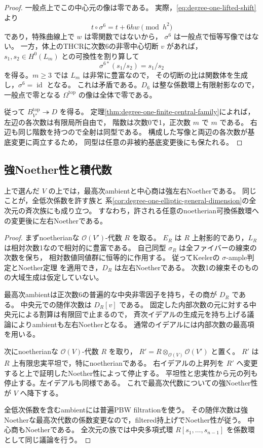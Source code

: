 \begin{proof}
一般点上でこの中心元の像は零である。
実際，\eqref{eq:degree-one-lifted-shift}より
\[
 t\circ\sigma^6=t+6hw\pmod {h^2}
\]
であり，特殊曲線上で $w$ は零関数ではないから，
$\sigma^6$ は一般点で恒等写像ではない。
一方，体上のTHCRに次数6の非零中心切断 $v$ があれば，
$s_1,s_2\in H^0(L_m)$ との可換性を割り算して
\[
 \sigma^{6*}(s_1/s_2)=s_1/s_2
\]
を得る。$m\ge3$ では $L_m$ は非常に豊富なので，
その切断の比は関数体を生成し，$\sigma^6=\operatorname{id}$ となる。
これは矛盾である。$D_6$ は整な係数環上有限射影なので，
一般点で零となる $\Omega^{\mathrm{top}}$ の像は全体で零である。

従って $B^{\mathrm{top}}_{V'}\twoheadrightarrow D$ を得る。
定理\ref{thm:degree-one-finite-central-family}によれば，左辺の各次数は有限局所自由で，
階数は次数0で1，正次数 $m$ で $m$ である。
右辺も同じ階数を持つので全射は同型である。
構成した写像と両辺の各次数が基底変更に両立するため，
同型は任意の非被約基底変更後にも保たれる。
\end{proof}

\subsection{強Noether性と積代数}

\begin{corollary}\label{cor:degree-one-strong-noetherian}
上で選んだ $V$ の上では，最高次ambientと中心商は強左右Noetherである。
同じことが，全低次係数を許す族と
系\ref{cor:degree-one-elliptic-general-dimension}の全次元の斉次族にも成り立つ。
すなわち，許される任意のnoetherian可換係数環への変更後に左右Noetherである。
\end{corollary}
\begin{proof}
まずnoetherianな $\mathcal O(V')$-代数 $R$ を取る。
$E_R$ は $R$ 上射影的であり，$L_R$ は相対次数1なので相対的に豊富である。
自己同型 $\sigma_R$ は全ファイバーの線束の次数を保ち，
相対数値同値群に恒等的に作用する。
従ってKeelerの $\sigma$-ample判定とNoether定理
\cite[Theorems 7.13, 7.14]{Keeler2003}を適用でき，$D_R$ は左右Noetherである。
次数1の線束そのものの大域生成は仮定していない。

最高次ambientは正次数6の普遍的な中央非零因子を持ち，その商が $D_R$ である。
中央元での随伴次数は $D_R[v]$ である。
固定した内部次数の元に対する中央元による割算は有限回で止まるので，
斉次イデアルの生成元を持ち上げる議論によりambientも左右Noetherとなる。
通常のイデアルには内部次数の最高項を用いる。

次にnoetherianな $\mathcal O(V)$-代数 $R$ を取り，
$R'=R\otimes_{\mathcal O(V)}\mathcal O(V')$ と置く。
$R'$ は $R$ 上有限忠実平坦で，特にnoetherianである。
右イデアルの上昇列を $R'$ へ変更すると上で証明したNoether性によって停止する。
平坦性と忠実性から元の列も停止する。左イデアルも同様である。
これで最高次代数についての強Noether性が $V$ へ降下する。

全低次係数を含むambientには普遍PBW filtrationを使う。
その随伴次数は強Noetherな最高次代数の係数変更なので，filtered持上げでNoether性が従う。
中心商もNoetherである。
全次元の族では中央多項式環 $R[s_1,\ldots,s_{n-1}]$ を係数環として同じ議論を行う。
\end{proof}

